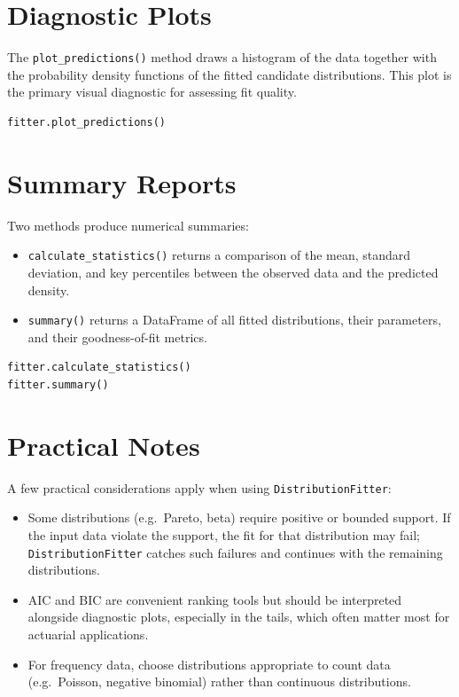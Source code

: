 \section{Diagnostic Plots}

The \texttt{plot\_predictions()} method draws a histogram of the data
together with the probability density functions of the fitted candidate
distributions. This plot is the primary visual diagnostic for assessing
fit quality.

\begin{lstlisting}[style=pythonstyle]
fitter.plot_predictions()
\end{lstlisting}

\section{Summary Reports}

Two methods produce numerical summaries:

\begin{itemize}[leftmargin=*]
    \item \texttt{calculate\_statistics()} returns a comparison of the
          mean, standard deviation, and key percentiles between the
          observed data and the predicted density.
    \item \texttt{summary()} returns a DataFrame of all fitted
          distributions, their parameters, and their goodness-of-fit
          metrics.
\end{itemize}

\begin{lstlisting}[style=pythonstyle]
fitter.calculate_statistics()
fitter.summary()
\end{lstlisting}

\section{Practical Notes}

A few practical considerations apply when using \texttt{DistributionFitter}:

\begin{itemize}[leftmargin=*]
    \item Some distributions (e.g.\ Pareto, beta) require positive or
          bounded support. If the input data violate the support, the
          fit for that distribution may fail; \texttt{DistributionFitter}
          catches such failures and continues with the remaining
          distributions.
    \item AIC and BIC are convenient ranking tools but should be
          interpreted alongside diagnostic plots, especially in the
          tails, which often matter most for actuarial applications.
    \item For frequency data, choose distributions appropriate to count
          data (e.g.\ Poisson, negative binomial) rather than continuous
          distributions.
\end{itemize}
